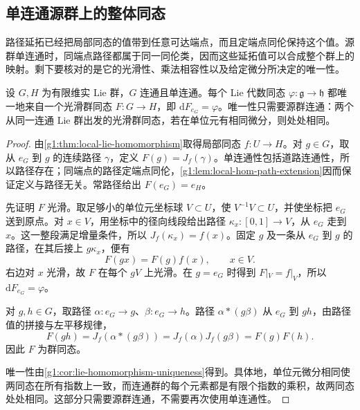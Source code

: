 \subsection{单连通源群上的整体同态}
\label{g1:subsec:1604:03}

路径延拓已经把局部同态的值带到任意可达端点，而且定端点同伦保持这个值。源群单连通时，同端点路径都属于同一同伦类，因而这些延拓值可以合成整个群上的映射。剩下要核对的是它的光滑性、乘法相容性以及给定微分所决定的唯一性。

\begin{theorem}
	\label{g1:thm:lie-homomorphism-integration}
	设 \(G,H\) 为有限维实 Lie 群，\(G\) 连通且单连通。每个 Lie 代数同态 \(\varphi:\mathfrak g\to\mathfrak h\) 都唯一地来自一个光滑群同态 \(F:G\to H\)，即 \(\mathrm{d}F_{e_G}=\varphi\)。唯一性只需要源群连通：两个从同一连通 Lie 群出发的光滑群同态，若在单位元有相同微分，则处处相同。
\end{theorem}
\begin{proof}
	由\cref{g1:thm:local-lie-homomorphism}取得局部同态 \(f:U\to H\)。对 \(g\in G\)，取从 \(e_G\) 到 \(g\) 的连续路径 \(\gamma\)，定义 \(F(g)=J_f(\gamma)\)。单连通性包括道路连通性，所以路径存在；同端点的路径定端点同伦，\cref{g1:lem:local-hom-path-extension}因而保证定义与路径无关。常路径给出 \(F(e_G)=e_H\)。

	先证明 \(F\) 光滑。取足够小的单位元坐标球 \(V\subset U\)，使 \(V^{-1}V\subset U\)，并使坐标把 \(e_G\) 送到原点。对 \(x\in V\)，用坐标中的径向线段给出路径 \(\kappa_x:[0,1]\to V\)，从 \(e_G\) 走到 \(x\)。这一整段满足增量条件，所以 \(J_f(\kappa_x)=f(x)\)。固定 \(g\) 及一条从 \(e_G\) 到 \(g\) 的路径，在其后接上 \(g\kappa_x\)，便有
	\[
		F(gx)=F(g)f(x),\qquad x\in V.
	\]
	右边对 \(x\) 光滑，故 \(F\) 在每个 \(gV\) 上光滑。在 \(g=e_G\) 时得到 \(F|_V=f|_V\)，所以 \(\mathrm{d}F_{e_G}=\varphi\)。

	对 \(g,h\in G\)，取路径 \(\alpha:e_G\to g\)、\(\beta:e_G\to h\)。路径 \(\alpha*(g\beta)\) 从 \(e_G\) 到 \(gh\)，由路径值的拼接与左平移规律，
	\[
		F(gh)=J_f(\alpha*(g\beta))
		=J_f(\alpha)J_f(g\beta)=F(g)F(h).
	\]
	因此 \(F\) 为群同态。

	唯一性由\cref{g1:cor:lie-homomorphism-uniqueness}得到。具体地，单位元微分相同使两同态在所有指数上一致，而连通群的每个元素都是有限个指数的乘积，故两同态处处相同。这部分只需要源群连通，不需要再次使用单连通性。
\end{proof}


